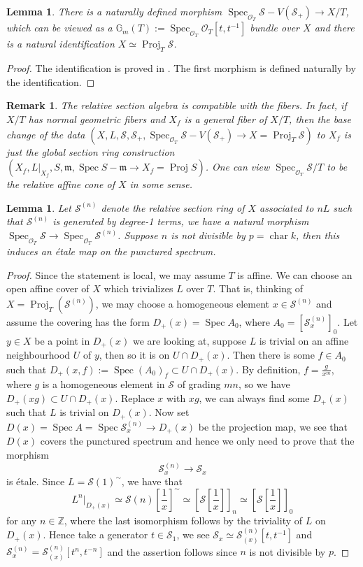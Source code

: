 \documentclass[letterpaper,reqno,12pt]{amsart}
\DeclareMathOperator{\Proj}{Proj}
\DeclareMathOperator{\Spec}{Spec}
\DeclareMathOperator{\chara}{char}
\numberwithin{equation}{section}
\theoremstyle{plain}
\newtheorem{lemma}[theorem]{Lemma}
\newtheorem{remark}{Remark}[section]
\begin{document}
\begin{lemma}\label{sectionring}
    There is a naturally defined morphism $\Spec_{\mathcal O_T}\mathcal S-V(\mathcal S_+)\to X/T$, which can be viewed as a $\mathbb G_m(T):=\Spec_{\mathcal O_T}\mathcal O_T[t,t^{-1}]$ bundle over $X$ and there is a natural identification $X\simeq \Proj_T\mathcal S$.
\end{lemma}
\begin{proof}
    The identification is proved in \cite[II.4.6.2]{PMIHES_1961__8__5_0}. The first morphism is defined naturally by the identification.
\end{proof}
\begin{remark}
    The relative section algebra is compatible with the fibers. In fact, if $X/T$ has normal geometric fibers and $X_f$ is a general fiber of $X/T$, then the base change of the data $(X,L,\mathcal S,\mathcal S_+,\Spec_{\mathcal O_T}\mathcal S-V(\mathcal S_+)\to X=\Proj_T \mathcal S)$ to $X_f$ is just the global section ring construction $(X_f,L|_{X_f},S,\mathfrak m,\Spec S-\mathfrak m\to X_f=\Proj S)$. One can view $\Spec_{\mathcal O_T}\mathcal S/T$ to be the relative affine cone of $X$ in some sense.
\end{remark}
\begin{lemma}\label{étaleness}
      Let $\mathcal S^{(n)}$ denote the relative section ring of $X$ associated to $nL$ such that $\mathcal S^{(n)}$ is generated by degree-1 terms, we have a natural morphism $\Spec_{\mathcal O_T}\mathcal S\to \Spec_{\mathcal O_T}\mathcal S^{(n)}$. Suppose $n$ is not divisible by $p=\chara k$, then this induces an étale map on the punctured spectrum.
\end{lemma}
\begin{proof}
    Since the statement is local, we may assume $T$ is affine.   We can choose an open affine cover of $X$ which trivializes $L$ over $T$. That is, thinking of $X=\Proj_T(\mathcal S^{(n)})$, we may choose a homogeneous element $x\in \mathcal S^{(n)}$ and assume the covering has the form $D_+(x)=\Spec A_0$, where $A_0=[\mathcal S^{(n)}_x]_0$. Let $y\in X$ be a point in $D_+(x)$ we are looking at, suppose $L$ is trivial on an affine neighbourhood $U$ of $y$, then so it is on $U\cap D_+(x)$. Then there is some $f\in A_0$ such that $D_+(x,f):=\Spec (A_0)_f\subset U\cap D_+(x)$.  By definition, $f=\frac{g}{x^m}$, where $g$ is a homogeneous element in $\mathcal S$ of grading $mn$, so we have $D_+(xg)\subset U\cap D_+(x)$. Replace $x$ with $xg$, we can always find some $D_+(x)$ such that $L$ is trivial on $D_+(x)$.  Now set $D(x)=\Spec A=\Spec \mathcal S^{(n)}_x\to D_+(x)$ be the projection map, we see that $D(x)$ covers the punctured spectrum and hence we only need to prove that the morphism
    \[\mathcal S^{(n)}_x\to \mathcal S_x\] is étale. Since $L=\mathcal S(1)^\sim$, we have that \[L^n|_{D_+(x)}\simeq \mathcal S(n)[\frac{1}{x}]^{\sim}\simeq [\mathcal S[\frac{1}{x}]]_n\simeq [\mathcal S[\frac{1}{x}]]_{0}\] for any $n\in\mathbb Z$, where the last isomorphism follows by the triviality of $L$ on $D_+(x)$. Hence take a generator $t\in \mathcal S_1$, we see $\mathcal S_x\simeq \mathcal S^{(n)}_{(x)}[t,t^{-1}]$ and $\mathcal S^{(n)}_x=\mathcal S^{(n)}_{(x)}[t^n,t^{-n}]$ and the assertion follows since $n$ is not divisible by $p$.
\end{proof}
\end{document}
